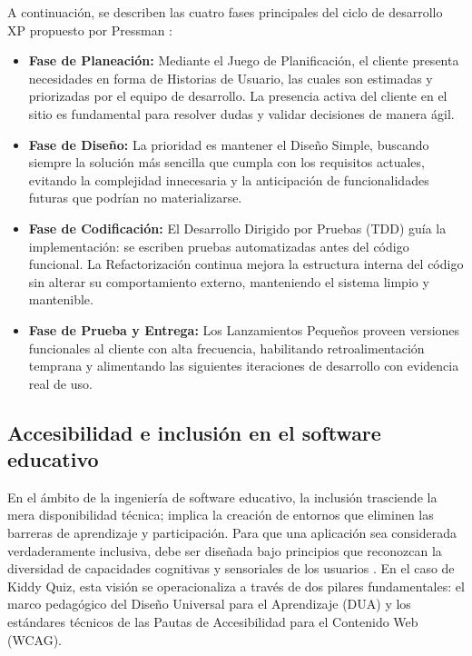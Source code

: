A continuación, se describen las cuatro fases principales del ciclo de desarrollo XP propuesto por Pressman \cite{beck2004xp}:

\begin{itemize}[leftmargin=*]
  \item \textbf{Fase de Planeación:} Mediante el Juego de Planificación, el cliente presenta necesidades en forma de Historias de Usuario, las cuales son estimadas y priorizadas por el equipo de desarrollo. La presencia activa del cliente en el sitio es fundamental para resolver dudas y validar decisiones de manera ágil.
  \item \textbf{Fase de Diseño:} La prioridad es mantener el Diseño Simple, buscando siempre la solución más sencilla que cumpla con los requisitos actuales, evitando la complejidad innecesaria y la anticipación de funcionalidades futuras que podrían no materializarse.
  \item \textbf{Fase de Codificación:} El Desarrollo Dirigido por Pruebas (TDD) guía la implementación: se escriben pruebas automatizadas antes del código funcional. La Refactorización continua mejora la estructura interna del código sin alterar su comportamiento externo, manteniendo el sistema limpio y mantenible.
  \item \textbf{Fase de Prueba y Entrega:} Los Lanzamientos Pequeños proveen versiones funcionales al cliente con alta frecuencia, habilitando retroalimentación temprana y alimentando las siguientes iteraciones de desarrollo con evidencia real de uso.
\end{itemize}

\subsection{Accesibilidad e inclusión en el software educativo}

En el ámbito de la ingeniería de software educativo, la inclusión
trasciende la mera disponibilidad técnica; implica la creación de
entornos que eliminen las barreras de aprendizaje y participación.
Para que una aplicación sea considerada verdaderamente inclusiva, debe
ser diseñada bajo principios que reconozcan la diversidad de
capacidades cognitivas y sensoriales de los usuarios
\cite{unesco2017inclusion}. En el caso de Kiddy Quiz, esta visión
se operacionaliza a través de dos pilares fundamentales: el marco
pedagógico del Diseño Universal para el Aprendizaje (DUA) y los
estándares técnicos de las Pautas de Accesibilidad para el Contenido
Web (WCAG).

